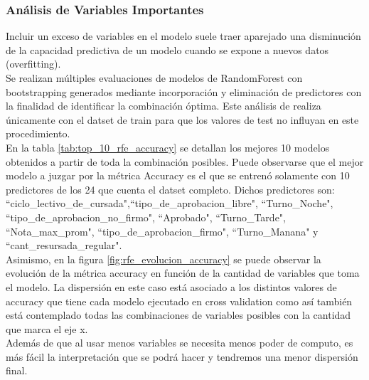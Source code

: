 \subsubsection{\textbf{Análisis de Variables Importantes}}\label{analisis-var_importantes}

Incluir un exceso de variables en el modelo suele traer aparejado una disminución de la capacidad predictiva de un modelo cuando se expone a nuevos datos (overfitting). \\
Se realizan múltiples evaluaciones de modelos de RandomForest con bootstrapping generados mediante incorporación y eliminación de predictores con la finalidad de identificar la combinación óptima. Este análisis de realiza únicamente con el datset de train para que los valores de test no influyan en este procedimiento.\\

En la tabla \ref{tab:top_10_rfe_accuracy} se detallan los mejores 10 modelos obtenidos a partir de toda la combinación posibles. Puede observarse que el mejor modelo a juzgar por la métrica Accuracy es el que se entrenó solamente con 10 predictores de los 24 que cuenta el datset completo. Dichos predictores son: 
``ciclo\_lectivo\_de\_cursada",``tipo\_de\_aprobacion\_libre", ``Turno\_Noche", ``tipo\_de\_aprobacion\_no\_firmo", ``Aprobado", ``Turno\_Tarde", ``Nota\_max\_prom", ``tipo\_de\_aprobacion\_firmo", ``Turno\_Manana" y ``cant\_resursada\_regular".\\

Asimismo, en la figura \ref{fig:rfe_evolucion_accuracy} se puede observar la evolución de la métrica accuracy en función de la cantidad de variables que toma el modelo. La dispersión en este caso está asociado a los distintos valores de accuracy que tiene cada modelo ejecutado en cross validation como así también está contemplado todas las combinaciones de variables posibles con la cantidad que marca el eje x.\\
Además de que al usar menos variables se necesita menos poder de computo, es más fácil la interpretación que se podrá hacer y tendremos una menor dispersión final.


